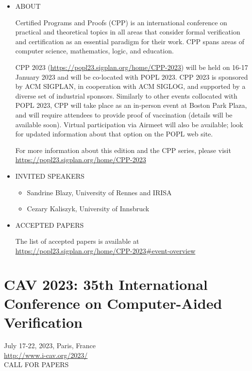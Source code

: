 \documentclass[prodmode,acmtecs]{acmsmall} %
\begin{document}
\begin{itemize}\item  ABOUT 
 
  Certified Programs and Proofs (CPP) is an international conference on practical and theoretical topics in all areas that consider formal verification and certification as an essential paradigm for their work. CPP spans areas of computer science, mathematics, logic, and education. 
 
  CPP 2023 (\href{https://popl23.sigplan.org/home/CPP-2023}{https://popl23.sigplan.org/home/CPP-2023}) will be held on 16-17 January 2023 and will be co-located with POPL 2023. CPP 2023 is sponsored by ACM SIGPLAN, in cooperation with ACM SIGLOG, and supported by a diverse set of industrial sponsors. Similarly to other events collocated with POPL 2023, CPP will take place as an in-person event at Boston Park Plaza, and will require attendees to provide proof of vaccination (details will be available soon). Virtual participation via Airmeet will also be available; look for updated information about that option on the POPL web site. 
 
  For more information about this edition and the CPP series, please visit \href{https://popl23.sigplan.org/home/CPP-2023}{https://popl23.sigplan.org/home/CPP-2023}  
 
\item  INVITED SPEAKERS 
 
\begin{itemize}\item  Sandrine Blazy, University of Rennes and IRISA
\item  Cezary Kaliszyk, University of Innsbruck
\end{itemize} 
\item  ACCEPTED PAPERS 
 
  The list of accepted papers is available at \href{https://popl23.sigplan.org/home/CPP-2023#event-overview}{https://popl23.sigplan.org/home/CPP-2023\#event-overview} 
 
\end{itemize}\section{CAV 2023: 35th International Conference on Computer-Aided Verification}\label{CAV2023}  July 17-22, 2023, Paris, France\\ 
  \href{http://www.i-cav.org/2023/}{http://www.i-cav.org/2023/}\\ 
CALL FOR PAPERS 
\end{document}
